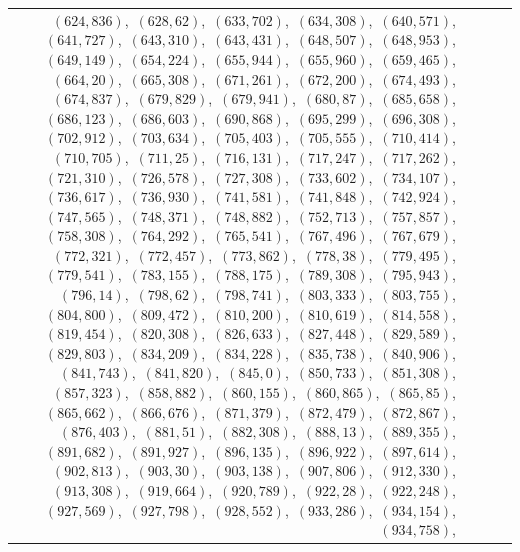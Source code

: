 \documentclass[11pt]{article}
\begin{document}
\begin{longtable}{@{}rrl>{\raggedright\arraybackslash}p{}@{}}
$(624,836)$,\allowbreak\ $(628,62)$,\allowbreak\ $(633,702)$,\allowbreak\ $(634,308)$,\allowbreak\ $(640,571)$,\allowbreak\ $(641,727)$,\allowbreak\ $(643,310)$,\allowbreak\ $(643,431)$,\allowbreak\ $(648,507)$,\allowbreak\ $(648,953)$,\allowbreak\ $(649,149)$,\allowbreak\ $(654,224)$,\allowbreak\ $(655,944)$,\allowbreak\ $(655,960)$,\allowbreak\ $(659,465)$,\allowbreak\ $(664,20)$,\allowbreak\ $(665,308)$,\allowbreak\ $(671,261)$,\allowbreak\ $(672,200)$,\allowbreak\ $(674,493)$,\allowbreak\ $(674,837)$,\allowbreak\ $(679,829)$,\allowbreak\ $(679,941)$,\allowbreak\ $(680,87)$,\allowbreak\ $(685,658)$,\allowbreak\ $(686,123)$,\allowbreak\ $(686,603)$,\allowbreak\ $(690,868)$,\allowbreak\ $(695,299)$,\allowbreak\ $(696,308)$,\allowbreak\ $(702,912)$,\allowbreak\ $(703,634)$,\allowbreak\ $(705,403)$,\allowbreak\ $(705,555)$,\allowbreak\ $(710,414)$,\allowbreak\ $(710,705)$,\allowbreak\ $(711,25)$,\allowbreak\ $(716,131)$,\allowbreak\ $(717,247)$,\allowbreak\ $(717,262)$,\allowbreak\ $(721,310)$,\allowbreak\ $(726,578)$,\allowbreak\ $(727,308)$,\allowbreak\ $(733,602)$,\allowbreak\ $(734,107)$,\allowbreak\ $(736,617)$,\allowbreak\ $(736,930)$,\allowbreak\ $(741,581)$,\allowbreak\ $(741,848)$,\allowbreak\ $(742,924)$,\allowbreak\ $(747,565)$,\allowbreak\ $(748,371)$,\allowbreak\ $(748,882)$,\allowbreak\ $(752,713)$,\allowbreak\ $(757,857)$,\allowbreak\ $(758,308)$,\allowbreak\ $(764,292)$,\allowbreak\ $(765,541)$,\allowbreak\ $(767,496)$,\allowbreak\ $(767,679)$,\allowbreak\ $(772,321)$,\allowbreak\ $(772,457)$,\allowbreak\ $(773,862)$,\allowbreak\ $(778,38)$,\allowbreak\ $(779,495)$,\allowbreak\ $(779,541)$,\allowbreak\ $(783,155)$,\allowbreak\ $(788,175)$,\allowbreak\ $(789,308)$,\allowbreak\ $(795,943)$,\allowbreak\ $(796,14)$,\allowbreak\ $(798,62)$,\allowbreak\ $(798,741)$,\allowbreak\ $(803,333)$,\allowbreak\ $(803,755)$,\allowbreak\ $(804,800)$,\allowbreak\ $(809,472)$,\allowbreak\ $(810,200)$,\allowbreak\ $(810,619)$,\allowbreak\ $(814,558)$,\allowbreak\ $(819,454)$,\allowbreak\ $(820,308)$,\allowbreak\ $(826,633)$,\allowbreak\ $(827,448)$,\allowbreak\ $(829,589)$,\allowbreak\ $(829,803)$,\allowbreak\ $(834,209)$,\allowbreak\ $(834,228)$,\allowbreak\ $(835,738)$,\allowbreak\ $(840,906)$,\allowbreak\ $(841,743)$,\allowbreak\ $(841,820)$,\allowbreak\ $(845,0)$,\allowbreak\ $(850,733)$,\allowbreak\ $(851,308)$,\allowbreak\ $(857,323)$,\allowbreak\ $(858,882)$,\allowbreak\ $(860,155)$,\allowbreak\ $(860,865)$,\allowbreak\ $(865,85)$,\allowbreak\ $(865,662)$,\allowbreak\ $(866,676)$,\allowbreak\ $(871,379)$,\allowbreak\ $(872,479)$,\allowbreak\ $(872,867)$,\allowbreak\ $(876,403)$,\allowbreak\ $(881,51)$,\allowbreak\ $(882,308)$,\allowbreak\ $(888,13)$,\allowbreak\ $(889,355)$,\allowbreak\ $(891,682)$,\allowbreak\ $(891,927)$,\allowbreak\ $(896,135)$,\allowbreak\ $(896,922)$,\allowbreak\ $(897,614)$,\allowbreak\ $(902,813)$,\allowbreak\ $(903,30)$,\allowbreak\ $(903,138)$,\allowbreak\ $(907,806)$,\allowbreak\ $(912,330)$,\allowbreak\ $(913,308)$,\allowbreak\ $(919,664)$,\allowbreak\ $(920,789)$,\allowbreak\ $(922,28)$,\allowbreak\ $(922,248)$,\allowbreak\ $(927,569)$,\allowbreak\ $(927,798)$,\allowbreak\ $(928,552)$,\allowbreak\ $(933,286)$,\allowbreak\ $(934,154)$,\allowbreak\ $(934,758)$,\allowbreak\ 
\end{longtable}
\end{document}
